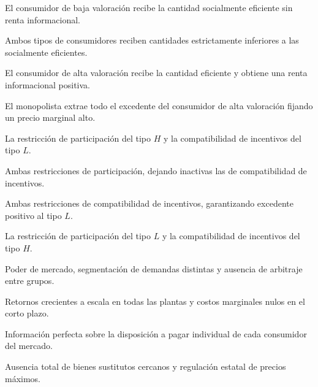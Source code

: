 \begin{opts}
    \item El consumidor de baja valoración recibe la cantidad socialmente eficiente sin renta informacional.
    \item Ambos tipos de consumidores reciben cantidades estrictamente inferiores a las socialmente eficientes.
    \item El consumidor de alta valoración recibe la cantidad eficiente y obtiene una renta informacional positiva.
    \item El monopolista extrae todo el excedente del consumidor de alta valoración fijando un precio marginal alto.
\end{opts}

\begin{opts}
    \item La restricción de participación del tipo $H$ y la compatibilidad de incentivos del tipo $L$.
    \item Ambas restricciones de participación, dejando inactivas las de compatibilidad de incentivos.
    \item Ambas restricciones de compatibilidad de incentivos, garantizando excedente positivo al tipo $L$.
    \item La restricción de participación del tipo $L$ y la compatibilidad de incentivos del tipo $H$.
\end{opts}

\begin{opts}
    \item Poder de mercado, segmentación de demandas distintas y ausencia de arbitraje entre grupos.
    \item Retornos crecientes a escala en todas las plantas y costos marginales nulos en el corto plazo.
    \item Información perfecta sobre la disposición a pagar individual de cada consumidor del mercado.
    \item Ausencia total de bienes sustitutos cercanos y regulación estatal de precios máximos.
\end{opts}

